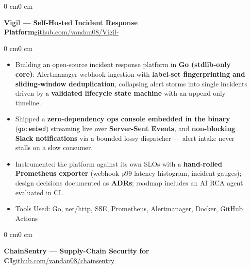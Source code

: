 \documentclass[10pt, letterpaper]{article}
\newenvironment{highlights}{
    \begin{itemize}[
        topsep=0.08 cm,
        parsep=0.08 cm,
        partopsep=0pt,
        itemsep=0pt,
        leftmargin=0.4 cm
    ]
}{
    \end{itemize}
}
\newenvironment{onecolentry}{
    \begin{adjustwidth}{0 cm}{0 cm}
}{
    \end{adjustwidth}
}
\let\hrefWithoutArrow\href
\begin{document}
    \begin{onecolentry}
        \textbf{Vigil --- Self-Hosted Incident Response Platform}\hfill{\small\hrefWithoutArrow{https://github.com/vandan08/Vigil-}{github.com/vandan08/Vigil-}}
    \end{onecolentry}

    \vspace{0.05 cm}
    \begin{onecolentry}
        \begin{highlights}
            \item Building an open-source incident response platform in \textbf{Go (stdlib-only core)}: Alertmanager webhook ingestion with \textbf{label-set fingerprinting and sliding-window deduplication}, collapsing alert storms into single incidents driven by a \textbf{validated lifecycle state machine} with an append-only timeline.
            \item Shipped a \textbf{zero-dependency ops console embedded in the binary} (\texttt{go:embed}) streaming live over \textbf{Server-Sent Events}, and \textbf{non-blocking Slack notifications} via a bounded lossy dispatcher --- alert intake never stalls on a slow consumer.
            \item Instrumented the platform against its own SLOs with a \textbf{hand-rolled Prometheus exporter} (webhook p99 latency histogram, incident gauges); design decisions documented as \textbf{ADRs}; roadmap includes an AI RCA agent evaluated in CI.
            \item Tools Used: Go, net/http, SSE, Prometheus, Alertmanager, Docker, GitHub Actions
        \end{highlights}
    \end{onecolentry}

    \vspace{0.2 cm}

    \begin{onecolentry}
        \textbf{ChainSentry --- Supply-Chain Security for CI}\hfill{\small\hrefWithoutArrow{https://github.com/vandan08/chainsentry}{github.com/vandan08/chainsentry}}
    \end{onecolentry}
\end{document}
